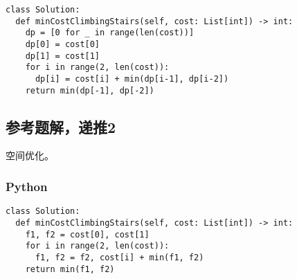 \begin{verbatim}
class Solution:
  def minCostClimbingStairs(self, cost: List[int]) -> int:
    dp = [0 for _ in range(len(cost))]
    dp[0] = cost[0]
    dp[1] = cost[1]
    for i in range(2, len(cost)):
      dp[i] = cost[i] + min(dp[i-1], dp[i-2])
    return min(dp[-1], dp[-2])
\end{verbatim}

\subsection{参考题解，递推2}

空间优化。

\subsubsection{Python}

\begin{verbatim}
class Solution:
  def minCostClimbingStairs(self, cost: List[int]) -> int:
    f1, f2 = cost[0], cost[1]
    for i in range(2, len(cost)):
      f1, f2 = f2, cost[i] + min(f1, f2)
    return min(f1, f2)
\end{verbatim}
